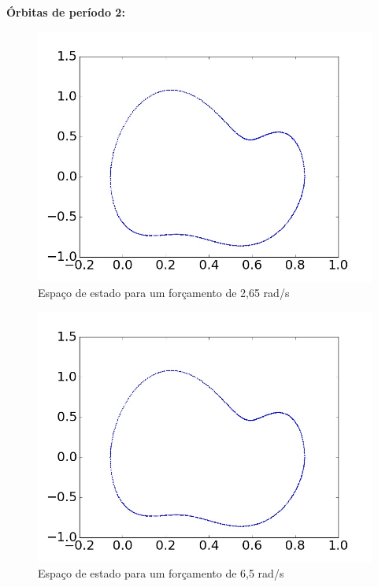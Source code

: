 \textbf{Órbitas de período 2:}

\begin{figure}[!ht]
	\centering
	\includegraphics[scale=0.35]{OPI_identification/state_space2,1.jpg}
	\caption{Espaço de estado para um forçamento de 2,65 rad/s}
	\label{state_space_2.65rad/s}
\end{figure}


\begin{figure}[!ht]
	\centering
	\includegraphics[scale=0.35]{OPI_identification/state_space2,1.jpg}
	\caption{Espaço de estado para um forçamento de 6,5 rad/s}
	\label{state_space_6.5rad/s}
\end{figure}

